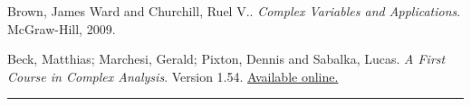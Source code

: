 \begin{enumerate}[leftmargin=*,itemsep=1em,label={[\arabic*]}]
\item Brown, James Ward and Churchill, Ruel V.. \emph{Complex Variables and Applications}. McGraw-Hill, 2009.
\item Beck, Matthias; Marchesi, Gerald; Pixton, Dennis and Sabalka, Lucas. \emph{A First Course in Complex Analysis}.  Version 1.54. \href{https://matthbeck.github.io/complex.html}{\color{darkblue} Available online.}
\end{enumerate}
%
\vspace*{5em}
%
\centering
\hrule


